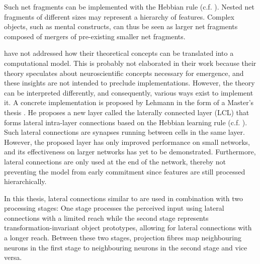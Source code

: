 Such net fragments can be implemented with the Hebbian rule (c.f. ).
Nested net fragments of different sizes may represent a hierarchy of features.
Complex objects, such as mental constructs, can thus be seen as larger net fragments composed of mergers of pre-existing smaller net fragments.

 have not addressed how their theoretical concepts can be translated into a computational model.
This is probably not elaborated in their work because their theory speculates about neuroscientific concepts necessary for emergence, and these insights are not intended to preclude implementations.
However, the theory can be interpreted differently, and consequently, various ways exist to implement it.
A concrete implementation is proposed by Lehmann in the form of a Master's thesis .
He proposes a new layer called the laterally connected layer (LCL) that forms lateral intra-layer connections based on the Hebbian learning rule (c.f. ).
Such lateral connections are synapses running between cells in the same layer.
However, the proposed layer has only improved performance on small networks, and its effectiveness on larger networks has yet to be demonstrated.
Furthermore, lateral connections are only used at the end of the network, thereby not preventing the model from early commitment since features are still processed hierarchically.

In this thesis, lateral connections similar to  are used in combination with two processing stages: One stage processes the perceived input using lateral connections with a limited reach while the second stage represents transformation-invariant object prototypes, allowing for lateral connections with a longer reach.
Between these two stages, projection fibres map neighbouring neurons in the first stage to neighbouring neurons in the second stage and vice versa.


